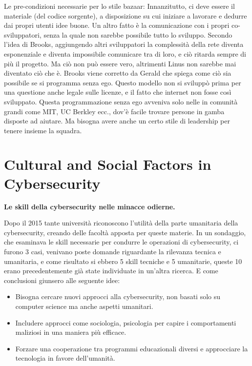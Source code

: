 \documentclass[a4page, 11pt, twocolumn]{article}
\begin{document}
Le pre-condizioni necessarie per lo stile bazaar: Innanzitutto, ci deve
essere il materiale (del codice sorgente), a disposizione su cui
iniziare a lavorare e dedurre dai propri utenti idee buone. Un altro
fatto è la comunicazione con i propri co-sviluppatori, senza la quale
non sarebbe possibile tutto lo sviluppo. Secondo l'idea di Brooks,
aggiungendo altri sviluppatori la complessità della rete diventa
esponenziale e diventa impossibile comunicare tra di loro, e ciò ritarda
sempre di più il progetto. Ma ciò non può essere vero, altrimenti Linus
non sarebbe mai diventato ciò che è. Brooks viene corretto da Gerald che
spiega come ciò sia possibile se si programma senza ego. Questo modello
non si sviluppò prima per una questione anche legale sulle licenze, e il
fatto che internet non fosse così sviluppato. Questa programmazione
senza ego avveniva solo nelle in comunità grandi come MIT, UC Berkley
ecc., dov'è facile trovare persone in gamba disposte ad aiutare. Ma
bisogna avere anche un certo stile di leadership per tenere insieme la
squadra.

\section{Cultural and Social Factors in Cybersecurity}

\textbf{Le skill della cybersecurity nelle minacce odierne.}

Dopo il 2015 tante università riconoscono l'utilità della parte
umanitaria della cybersecurity, creando delle facoltà apposta per queste
materie. In un sondaggio, che esaminava le skill necessarie per condurre
le operazioni di cybersecurity, ci furono 3 casi, venivano poste domande
riguardante la rilevanza tecnica e umanitaria, e come risultato si
ebbero 5 skill tecniche e 5 umanitarie, queste 10 erano precedentemente
già state individuate in un'altra ricerca. E come conclusioni giunsero
alle seguente idee:

\begin{itemize}
	\item
	Bisogna cercare nuovi approcci alla cybersecurity, non basati solo su
	computer science ma anche aspetti umanitari.
	\item
	Includere approcci come sociologia, psicologia per capire i
	comportamenti maliziosi in una maniera più efficace.
	\item
	Forzare una cooperazione tra programmi educazionali diversi e
	approcciare la tecnologia in favore dell'umanità.
\end{itemize}
\end{document}
